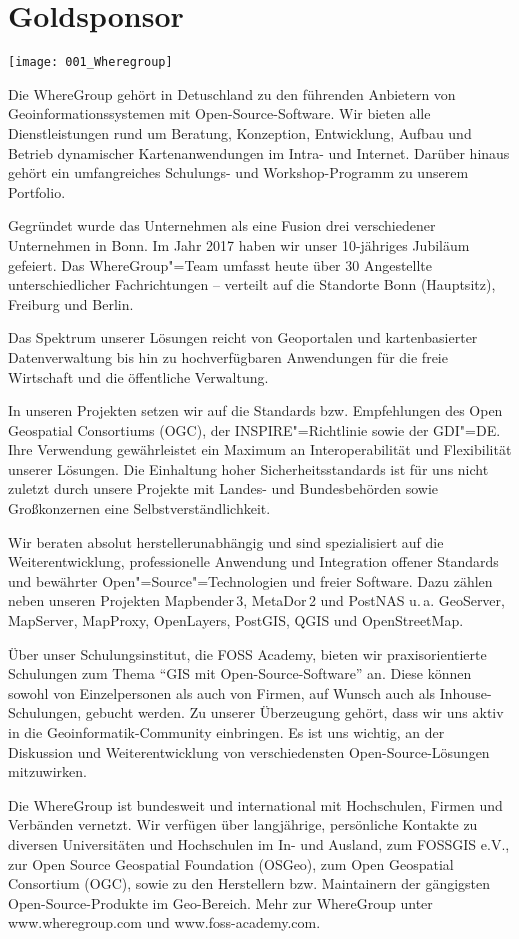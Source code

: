 \section*{Goldsponsor}
\begin{center}
	\texttt{[image: 001\_Wheregroup]}
\end{center}
Die WhereGroup gehört in Detuschland zu den führenden Anbietern von Geoinformationssystemen mit
Open-Source-Software. Wir bieten alle Dienstleistungen rund um Beratung, Konzeption, Entwicklung,
Aufbau und Betrieb dynamischer Kartenanwendungen im Intra- und Internet. Darüber hinaus gehört ein
umfangreiches Schu\-lungs- und Workshop-Programm zu unserem Portfolio.

Gegründet wurde das Unternehmen als eine Fusion drei verschiedener Unternehmen in Bonn. Im Jahr 2017
haben wir unser 10-jähriges Jubiläum gefeiert. Das WhereGroup"=Team umfasst heute über 30 Angestellte
unterschiedlicher Fachrichtungen -- verteilt auf die Standorte Bonn (Hauptsitz), Freiburg und Berlin.

Das Spektrum unserer Lösungen reicht von Geoportalen und kartenbasierter
Datenverwaltung bis hin zu hochverfügbaren Anwendungen für die freie Wirtschaft und die öffentliche
Verwaltung.

In unseren Projekten setzen wir auf die Standards bzw. Empfehlungen des Open Geospatial
Consortiums (OGC), der INSPIRE"=Richtlinie sowie der GDI"=DE. Ihre Verwendung gewährleistet ein Maximum
an Interoperabilität und Flexibilität unserer Lösungen. Die Einhaltung hoher Sicherheitsstandards
ist für uns nicht zuletzt durch unsere Projekte mit Landes- und Bundesbehörden sowie Großkonzernen
eine Selbst\-ver\-ständ\-lichkeit.

Wir beraten absolut herstellerunabhängig und sind spezialisiert auf die Weiterentwicklung,
professionelle Anwendung und Integration offener Standards und bewährter
Open"=Source"=Technologien und freier Software. Dazu zählen neben unseren Projekten Mapbender\,3,
MetaDor\,2 und PostNAS u.\,a. GeoServer, MapServer, MapProxy, OpenLay\-ers, PostGIS, QGIS und
OpenStreetMap.

Über unser Schulungsinstitut, die FOSS Academy, bieten wir praxisorientierte
Schulungen zum Thema "`GIS mit Open-Source-Software"' an. Diese können sowohl von Einzelpersonen als
auch von Firmen, auf Wunsch auch als Inhouse-Schulungen, gebucht werden.
Zu unserer Überzeugung
gehört, dass wir uns aktiv in die Geoinformatik-Community einbringen. Es ist uns wichtig, an der
Diskussion und Weiterentwicklung von verschiedensten Open-Source-Lösungen mitzuwirken.

\enlargethispage{1.5\baselineskip}
Die WhereGroup ist bundesweit und international mit Hochschulen, Firmen und Verbänden vernetzt. Wir
verfügen über langjährige, persönliche Kontakte zu diversen Universitäten und Hochschulen im In- und
Ausland, zum FOSSGIS e.V., zur Open Source Geospatial Foundation (OSGeo), zum Open Geospatial
Consortium (OGC), sowie zu den Herstellern bzw. Maintainern der gängigsten Open-Source-Produkte im
Geo-Bereich.  Mehr zur WhereGroup unter www.wheregroup.com und www.foss-academy.com.
